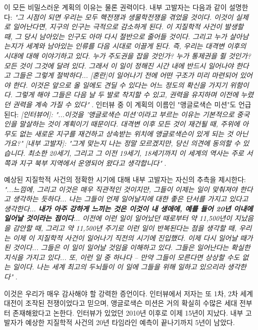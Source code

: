 \documentclass[10pt,twocolumn,letterpaper]{article}
\begin{document}
이 모든 비밀스러운 계획의 이유는 물론 권력이다. 내부 고발자는 다음과 같이 설명한다: \textit{"그 시점이 되면 우리는 모두 핵전쟁과 생물학전쟁을 겪었을 것이다. 이것이 실제로 일어난다면, 지구의 인구는 극적으로 감소하게 된다. 이 지질학적 사건이 발생할 때, 그 당시 남아있는 인구도 아마 다시 절반으로 줄어들 것이다. 그리고 누가 살아남는지가 세계와 남아있는 인류를 다음 시대로 이끌게 된다. 즉, 우리는 대격변 이후의 시대에 대해 이야기하고 있다. 누가 주도권을 잡을 것인가? 누가 통제권을 쥘 것인가? 모든 것이 그것에 달려 있다. 그래서 이 일이 정해진 시간 내에 반드시 일어나야 한다고 그들은 그렇게 절박하다... [혼란]이 일어나기 전에 어떤 구조가 미리 마련되어 있어야 한다. 이것은 앞으로 올 일에도 견딜 수 있다는 어느 정도의 확신을 가지기 위함이다. 그렇게 해야 그들은 다음 날 두 발로 착지할 수 있고, 권력을 유지하며 이전에 누렸던 권력을 계속 가질 수 있다"} \cite{4}. 인터뷰 중 이 계획의 이름인 "앵글로색슨 미션"도 언급된다: \textit{[인터뷰어]: "...이것을 '앵글로색슨 미션'이라고 부르는 이유는 기본적으로 중국인을 말살하는 것이 계획이기 때문이다. 대격변 이후 모든 것이 재건될 때, 주위에 아무도 없는 새로운 지구를 재건하고 상속받는 위치에 앵글로색슨이 있게 되는 것 아닌가요?" [내부 고발자]: "그게 맞는지 나는 정말 모르겠지만, 당신 의견에 동의할 수 있습니다. 최소한 20세기, 그리고 그 이전 19세기, 18세기까지 이 세계의 역사는 주로 서쪽과 지구 북부 지역에서 운영되어 왔다고 생각합니다"} \cite{4}.

예상된 지질학적 사건의 정확한 시기에 대해 내부 고발자는 자신의 추측을 제시한다: \textit{"...느낌에, 그리고 이것은 매우 직관적인 것이지만, 그들이 이제는 일이 맞춰져야 한다고 생각하는 듯하다... 나는 그들이 언제 일어날지에 대한 좋은 단서를 가지고 있다고 생각한다... \textbf{내가 아주 강하게 느끼는 것은 이것이 내 생애에, 예를 들어 20년 이내에 일어날 것이라는 점이다}... 이전에 이런 일이 일어났던 때로부터 약 11,500년이 지났음을 감안할 때, 그리고 약 11,500년 주기로 이런 일이 반복된다는 점을 생각할 때, 우리는 이제 이 지질학적 사건이 일어나기 직전의 시기에 진입했다. 이제 다시 일어날 때가 된 것이다... 그들은 이 일이 일어날 것임을 이해하고 있다. 그들은 일어난다는 확실한 지식을 가지고 있다... 또, 이런 일 중 하나다 -- 만약 그들이 모른다면 상상할 수도 없는 일이다. 나는 세계 최고의 두뇌들이 이 일에 그들을 위해 일하고 있으리라 생각한다"} \cite{4}.

이것은 우리가 매우 감사해야 할 강력한 증언이다. 인터뷰에서 저자는 또 1차, 2차 세계대전이 조작된 전쟁이었다고 믿으며, 앵글로색슨 미션은 거의 확실히 수많은 세대 전부터 존재해왔다고 논한다. 인터뷰가 있었던 2010년 이후로 이제 15년이 지났다. 내부 고발자가 예상한 지질학적 사건의 20년 타임라인 예측이 끝나기까지 5년이 남았다.
\end{document}
